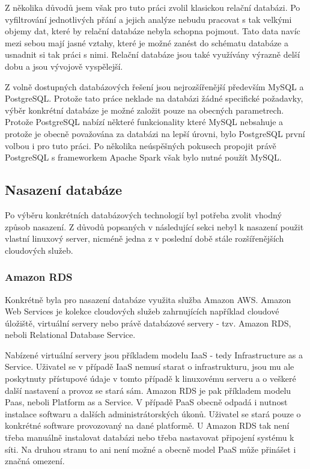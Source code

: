\documentclass[thesis=B,czech]{FITthesis}[2012/06/26]
\begin{document}
	Z několika důvodů jsem však pro tuto práci zvolil klasickou relační databázi. Po vyfiltrování jednotlivých přání a jejich analýze nebudu pracovat s tak velkými objemy dat, které by relační databáze nebyla schopna pojmout. Tato data navíc mezi sebou mají jasné vztahy, které je možné zanést do schématu databáze a usnadnit si tak práci s nimi. Relační databáze jsou také využívány výrazně delší dobu a jsou vývojově vyspělejší. 
	
	Z volně dostupných databázových řešení jsou nejrozšířenější především MySQL a PostgreSQL. Protože tato práce neklade na databázi žádné specifické požadavky, výběr konkrétní databáze je možné založit pouze na obecných parametrech. Protože PostgreSQL nabízí některé funkcionality které MySQL nebsahuje a protože je obecně považována za databázi na lepší úrovni\cite{aaaaaaaa}, bylo PostgreSQL první volbou i pro tuto práci. Po několika neúspěšných pokusech propojit právě PostgreSQL s frameworkem Apache Spark však bylo nutné použít MySQL. 
	
\subsection{Nasazení databáze}
	Po výběru konkrétních databázových technologií byl potřeba zvolit vhodný způsob nasazení. Z důvodů popsaných v následující sekci nebyl k nasazení použit vlastní linuxový server, nicméně jedna z v poslední době stále rozšířenějších cloudových služeb. 
	
\subsubsection{Amazon RDS}
\label{amazon-aws}
	Konkrétně byla pro nasazení databáze využita služba Amazon AWS\cite{gghjjkk}. Amazon Web Services je kolekce cloudových služeb zahrnujících například cloudové úložiště, virtuální servery nebo právě databázové servery - tzv. Amazon RDS, neboli Relational Database Service. 
	
	Nabízené virtuální servery jsou příkladem modelu IaaS - tedy Infrastructure as a Service. Uživatel se v případě IaaS nemusí starat o infrastrukturu, jsou mu ale poskytnuty přístupové údaje v tomto případě k linuxovému serveru a o veškeré další nastavení a provoz se stará sám. Amazon RDS je pak příkladem modelu Paas, neboli Platform as a Service. V případě PaaS obecně odpadá i nutnost instalace softwaru a dalších administrátorských úkonů. Uživatel se stará pouze o konkrétné software provozovaný na dané platformě. U Amazon RDS tak není třeba manuálně instalovat databázi nebo třeba nastavovat připojení systému k síti. Na druhou stranu to ani není možné a obecně model PaaS může přinášet i značná omezení. 
	
\end{document}

